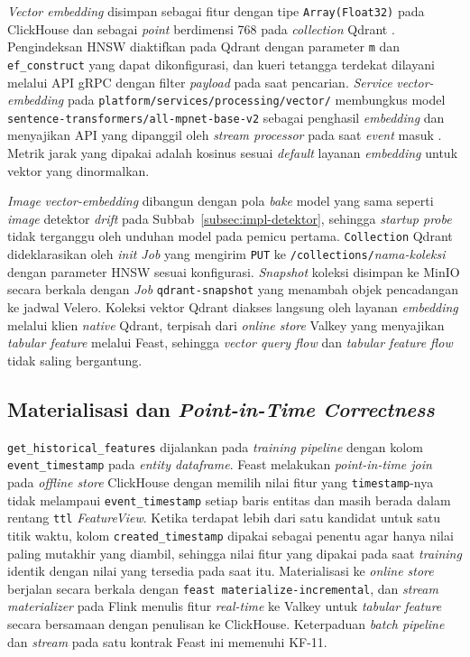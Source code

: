 \textit{Vector embedding} disimpan sebagai fitur dengan tipe \texttt{Array(Float32)} pada ClickHouse dan sebagai \textit{point} berdimensi 768 pada \textit{collection} Qdrant \autocite{qdrant2025}. Pengindeksan HNSW diaktifkan pada Qdrant dengan parameter \texttt{m} dan \texttt{ef\_construct} yang dapat dikonfigurasi, dan kueri tetangga terdekat dilayani melalui API gRPC dengan filter \textit{payload} pada saat pencarian. \textit{Service} \textit{vector-embedding} pada \texttt{platform/services/processing/vector/} membungkus model \texttt{sentence-transformers/all-mpnet-base-v2} sebagai penghasil \textit{embedding} dan menyajikan API yang dipanggil oleh \textit{stream processor} pada saat \textit{event} masuk \autocite{reimers2019sentence}. Metrik jarak yang dipakai adalah kosinus sesuai \textit{default} layanan \textit{embedding} untuk vektor yang dinormalkan.

\textit{Image} \textit{vector-embedding} dibangun dengan pola \textit{bake} model yang sama seperti \textit{image} detektor \textit{drift} pada Subbab~\ref{subsec:impl-detektor}, sehingga \textit{startup probe} tidak terganggu oleh unduhan model pada pemicu pertama. \texttt{Collection} Qdrant dideklarasikan oleh \textit{init Job} yang mengirim \texttt{PUT} ke \texttt{/collections/}\textit{nama-koleksi} dengan parameter HNSW sesuai konfigurasi. \textit{Snapshot} koleksi disimpan ke MinIO secara berkala dengan \textit{Job} \texttt{qdrant-snapshot} yang menambah objek pencadangan ke jadwal Velero. Koleksi vektor Qdrant diakses langsung oleh layanan \textit{embedding} melalui klien \textit{native} Qdrant, terpisah dari \textit{online store} Valkey yang menyajikan \textit{tabular feature} melalui Feast, sehingga \textit{vector query flow} dan \textit{tabular feature flow} tidak saling bergantung.

\subsection{Materialisasi dan \textit{Point-in-Time Correctness}}
\label{subsec:impl-pit}

\texttt{get\_historical\_features} dijalankan pada \textit{training pipeline} dengan kolom \texttt{event\_timestamp} pada \textit{entity dataframe}. Feast melakukan \textit{point-in-time join} pada \textit{offline store} ClickHouse dengan memilih nilai fitur yang \texttt{timestamp}-nya tidak melampaui \texttt{event\_timestamp} setiap baris entitas dan masih berada dalam rentang \texttt{ttl} \textit{FeatureView}. Ketika terdapat lebih dari satu kandidat untuk satu titik waktu, kolom \texttt{created\_timestamp} dipakai sebagai penentu agar hanya nilai paling mutakhir yang diambil, sehingga nilai fitur yang dipakai pada saat \textit{training} identik dengan nilai yang tersedia pada saat itu. Materialisasi ke \textit{online store} berjalan secara berkala dengan \texttt{feast materialize-incremental}, dan \textit{stream materializer} pada Flink menulis fitur \textit{real-time} ke Valkey untuk \textit{tabular feature} secara bersamaan dengan penulisan ke ClickHouse. Keterpaduan \textit{batch pipeline} dan \textit{stream} pada satu kontrak Feast ini memenuhi KF-11.

